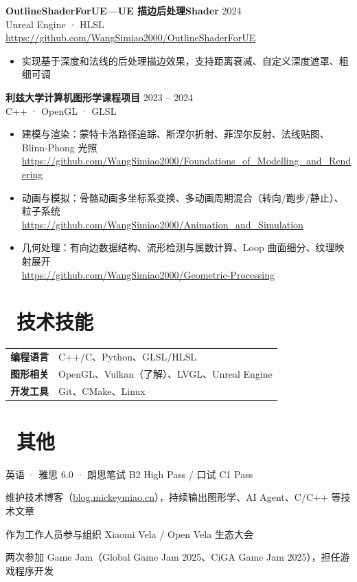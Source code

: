 \documentclass[10pt,a4paper]{article}
\newcommand{\smallurl}[1]{\href{#1}{{\small #1}}}
\begin{document}
\vspace{3pt}

\textbf{OutlineShaderForUE\hspace{0.3em}—\hspace{0.3em}UE 描边后处理Shader} \hfill 2024 \\
Unreal Engine · HLSL \hfill \smallurl{https://github.com/WangSimiao2000/OutlineShaderForUE}
\begin{itemize}
  \item 实现基于深度和法线的后处理描边效果，支持距离衰减、自定义深度遮罩、粗细可调
\end{itemize}

\vspace{3pt}

\textbf{利兹大学计算机图形学课程项目} \hfill 2023 -- 2024 \\
C++ · OpenGL · GLSL
\begin{itemize}
  \item 建模与渲染：蒙特卡洛路径追踪、斯涅尔折射、菲涅尔反射、法线贴图、Blinn-Phong 光照 \\ {\small \smallurl{https://github.com/WangSimiao2000/Foundations\_of\_Modelling\_and\_Rendering}}
  \item 动画与模拟：骨骼动画多坐标系变换、多动画周期混合（转向/跑步/静止）、粒子系统 \\ {\small \smallurl{https://github.com/WangSimiao2000/Animation\_and\_Simulation}}
  \item 几何处理：有向边数据结构、流形检测与属数计算、Loop 曲面细分、纹理映射展开 \\ {\small \smallurl{https://github.com/WangSimiao2000/Geometric-Processing}}
\end{itemize}

\section{\faTools\ 技术技能}

\begin{tabularx}{\textwidth}{@{} l X}
  \textbf{编程语言} & C++/C、Python、GLSL/HLSL \\
  \textbf{图形相关} & OpenGL、Vulkan（了解）、LVGL、Unreal Engine \\
  \textbf{开发工具} & Git、CMake、Linux \\
\end{tabularx}

\section{\faUser\ 其他}

英语 · 雅思 6.0 · 朗思笔试 B2 High Pass / 口试 C1 Pass

维护技术博客（\href{https://blog.mickeymiao.cn}{blog.mickeymiao.cn}），持续输出图形学、AI Agent、C/C++ 等技术文章

作为工作人员参与组织 Xiaomi Vela / Open Vela 生态大会

两次参加 Game Jam（Global Game Jam 2025、CiGA Game Jam 2025），担任游戏程序开发
\end{document}
